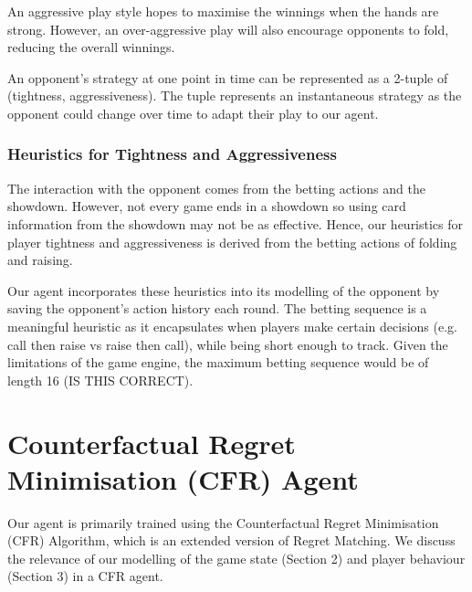 \documentclass{article}
\begin{document}
An aggressive play style hopes to maximise the winnings when the hands are strong. However, an over-aggressive play will also encourage opponents to fold, reducing the overall winnings.

An opponent's strategy at one point in time can be represented as a 2-tuple of (tightness, aggressiveness). The tuple represents an instantaneous strategy as the opponent could change over time to adapt their play to our agent.

\subsubsection{Heuristics for Tightness and Aggressiveness}
The interaction with the opponent comes from the betting actions and the showdown. However, not every game ends in a showdown so using card information from the showdown may not be as effective. Hence, our heuristics for player tightness and aggressiveness is derived from the betting actions of folding and raising.


Our agent incorporates these heuristics into its modelling of the opponent by saving the opponent's action history each round. The betting sequence is a meaningful heuristic as it encapsulates when players make certain decisions (e.g. call then raise vs raise then call), while being short enough to track. Given the limitations of the game engine, the maximum betting sequence would be of length 16 (IS THIS CORRECT). 

\section{Counterfactual Regret Minimisation (CFR) Agent}

Our agent is primarily trained using the Counterfactual Regret Minimisation (CFR) Algorithm, which is an extended version of Regret Matching. We discuss the relevance of our modelling of the game state (Section 2) and player behaviour (Section 3) in a CFR agent.
\end{document}
